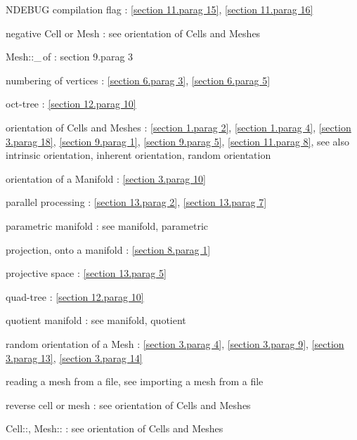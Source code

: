 \documentclass[a4paper]{scrreprt}
\def\numb{}
\newcommand\verm[1]{\textcolor{manif}{#1}}
\renewcommand\tt{\normalfont\ttfamily}
\begin{document}
\noindent
{\small\tt NDEBUG} compilation flag : \ref{\numb section 11.\numb parag 15},
\ref{\numb section 11.\numb parag 16}

\noindent
negative {\small\tt \verm{Cell}} or {\small\tt \verm{Mesh}} :
see orientation of {\small\tt \verm{Cell}}s and {\small\tt \verm{Mesh}}es

\noindent
{\small\tt\verm{Mesh}::\_\,of} : {\numb section 9.\numb parag 3}

\noindent
numbering of vertices :
\ref{\numb section 6.\numb parag 3}, \ref{\numb section 6.\numb parag 5}

\noindent
oct-tree : \ref{\numb section 12.\numb parag 10}

\noindent
orientation of {\small\tt \verm{Cell}}s and {\small\tt \verm{Mesh}}es :
\ref{\numb section 1.\numb parag 2}, \ref{\numb section 1.\numb parag 4},
\ref{\numb section 3.\numb parag 18}, \ref{\numb section 9.\numb parag 1},
\ref{\numb section 9.\numb parag 5}, \ref{\numb section 11.\numb parag 8},\hfil\break
\hglue 9mm see also intrinsic orientation, inherent orientation, random orientation

\noindent
orientation of a {\small\tt \verm{Manifold}} : \ref{\numb section 3.\numb parag 10}

\noindent
parallel processing : \ref{\numb section 13.\numb parag 2}, \ref{\numb section 13.\numb parag 7}

\noindent
parametric manifold : see manifold, parametric

\noindent
projection, onto a manifold :
\ref{\numb section 8.\numb parag 1}

\noindent
projective space : \ref{\numb section 13.\numb parag 5}

\noindent
quad-tree : \ref{\numb section 12.\numb parag 10}

\noindent
quotient manifold : see manifold, quotient

\noindent
random orientation of a {\small\tt\verm{Mesh}} : \ref{\numb section 3.\numb parag 4},
\ref{\numb section 3.\numb parag 9}, \ref{\numb section 3.\numb parag 13},
\ref{\numb section 3.\numb parag 14}

\noindent
reading a mesh from a file, see importing a mesh from a file

\noindent
reverse cell or mesh : see orientation of {\small\tt \verm{Cell}}s and {\small\tt \verm{Mesh}}es

\noindent
{\small\tt\verm{Cell}::}, {\small\tt\verm{Mesh}::} :
see orientation of {\small\tt \verm{Cell}}s and {\small\tt \verm{Mesh}}es
\end{document}

